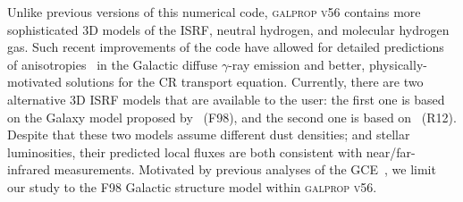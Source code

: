 \documentclass[doublespace,draft,nopageskip]{VTthesis} %
\begin{document}
Unlike previous versions of this numerical code, \textsc{galprop v56}  contains more sophisticated 3D models of the ISRF, 
neutral hydrogen, and molecular hydrogen gas. Such recent improvements of the code have allowed for detailed predictions of anisotropies~\citep{Porter:2017vaa,Johannesson:2018bit} in the Galactic diffuse $\gamma$-ray emission and better, physically-motivated solutions for the CR transport equation.
%
 Currently, there are two alternative 3D ISRF models that are available to the user: the first one is based on the Galaxy model proposed by~\cite{Freudenreich:1998} (F98), and the second one is based on~\cite{R12} (R12). Despite that these two models assume different dust densities; and stellar luminosities, their predicted local fluxes are both consistent with near/far-infrared measurements. Motivated by previous analyses of the GCE~\citep{Macias:2016nev,Bartels:2017vsx,Macias:2019omb}, we limit our study to the F98 Galactic structure model within \textsc{galprop v56}.  
\end{document}
